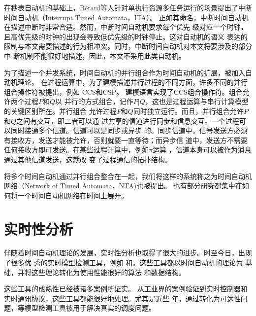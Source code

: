 在秒表自动机的基础上，B{\'e}rard等人针对单执行资源多任务运行的场景提出了中断
时间自动机（Interrupt Timed Automata，ITA）。\cite{Berard:2012:ITA:2158996.2159045}
正如其命名，中断时间自动机在描述中断时非常合适。然而，中断时间自动机要求每个优先
级对应一个时钟，且高优先级的时钟的出现会导致低优先级的时钟停止。这对自动机的语义
表达的限制与本文需要描述的行为相冲突。同时，中断时间自动机对本文将要涉及的部分中
断机制不能很好地描述，因此，本文不采用此类自动机。

为了描述一个并发系统，时间自动机的并行组合作为时间自动机的扩展，被加入自动机理论。
在过程运算中，为了建模描述并行过程的不同方面，许多不同的并行组合操作符被提出，例如
CCS\cite{Milner:1989:CC:534666}和CSP\cite{Hoare:1978:CSP:359576.359585}。\uppaal 
建模语言\cite{Larsen97uppaalin}实现了CCS组合操作符。组合允许两个过程$P$和$Q$以
并行的方式组合，记作$P|Q$，这也是过程运算与串行计算模型的关键区别所在。并行组合
允许过程$P$和$Q$同时独立运行。而且，并行组合允许$P$和$Q$之间有交互，即二者可以通
过共享的信道进行同步和信息交互。一个过程可以同时接通多个信道。信道可以是同步或异步
的。同步信道中，信号发送方必须有接收方，发送才能被允许，否则就要一直等待；而异步信
道中，发送方不需要任何接收方即可发送。在某些过程计算中，例如$\pi$运算
\cite{Sangiorgi:2001:PTM:559050}，信道本身可以被作为消息通过其他信道发送，这就改
变了过程通信的拓扑结构。

将多个时间自动机通过并行组合整合在一起，我们将这样的系统称之为时间自动机网络（Network 
of Timed Automata，NTA)也被提出。\cite{Alur:1994:TTA:180782.180519,Bouyer06timedunfoldings}
也有部分研究都集中在如何将一个时间自动机网络在时间上展开。\cite{Bouyer06timedunfoldings}

\section{实时性分析}
\label{sec:timing_study}

伴随着时间自动机理论的发展，实时性分析也取得了很大的进步。时至今日，出现了很多优
秀的实时模型检测工具，例如\uppaal \cite{Behrmann04atutorial, Larsen97efficientverification}
和\cite{Yovine97kronos:a}。这些工具都以时间自动机的理论为
基础，并将这些理论转化为使用性能很好的算法
\cite{Behrmann:2002:UIS:646847.707113, Behrmann:2006:LUB:1165374.1165376, BehrmannHV00, Behrmann:to}
和数据结构\cite{Behrmann98efficienttimed, Larsen97efficientverification, Larsen:1999:CDD:774455.774459}。

这些工具的成熟性已经被诸多案例所证实。\cite{D'Argenio:1997:BRP:646481.691445,Ernits:2005:MAS:1124427.1124429,Hen05a,Jensen:2000:SUU:646846.706958,Lamport:2005:RMC:2156375.2156396,Larsen:2005:TRE:1086228.1086283,Lindahl:1998:FDA:646482.691449}
从工业界的案例验证到实时控制器和实时通讯协议，这些工具都能很好地处理。尤其是近些
年，通过转化为可达性问题，\uppaal 等模型检测工具被用于解决真实的调度问题。
\cite{Abdeddaim:1,Fehnker:811256,Hune:2001:GSC:774194.774198,Bouyer06timedunfoldings}

